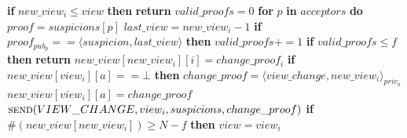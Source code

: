 \documentclass[algorithms,article,accept,moreauthors,pdftex,10pt,a4paper]{Definitions/mdpi}
\begin{document}
\begin{algorithm}[H]
\begin{algorithmic}[1]
\State\hspace{\algorithmicindent} \textbf{if} $new\_view_i \leq view$ \textbf{then}
\State\hspace{\algorithmicindent}\hspace{\algorithmicindent}\textbf{return}
\State
\State\hspace{\algorithmicindent} $valid\_proofs = 0$
\State\hspace{\algorithmicindent} \textbf{for} $p$ \textbf{in} $acceptors$ \textbf{do} 
\State\hspace{\algorithmicindent}\hspace{\algorithmicindent} $proof = suspicions[p]$
\State\hspace{\algorithmicindent}\hspace{\algorithmicindent} $last\_view = new\_view_i-1$
\State\hspace{\algorithmicindent}\hspace{\algorithmicindent} \textbf{if} $proof_{pub_p} == \langle suspicion, last\_view \rangle$ \textbf{then}
\State\hspace{\algorithmicindent}\hspace{\algorithmicindent}\hspace{\algorithmicindent} $valid\_proofs \mathrel{+{=}} 1$
\State
\State\hspace{\algorithmicindent} \textbf{if} $valid\_proofs \leq f$ \textbf{then}
\State\hspace{\algorithmicindent}\hspace{\algorithmicindent} \textbf{return}
\State
\State\hspace{\algorithmicindent} $new\_view[new\_view_i][i] = change\_proof_i$
\State\hspace{\algorithmicindent} \textbf{if} $new\_view[view_i][a] == \bot$ \textbf{then} 
\State\hspace{\algorithmicindent}\hspace{\algorithmicindent} $change\_proof = \langle view\_change, new\_view_i \rangle_{priv_a}$
\State\hspace{\algorithmicindent}\hspace{\algorithmicindent} $new\_view[view_i][a] = change\_proof$
\State\hspace{\algorithmicindent}\hspace{\algorithmicindent} $\Call{send}{VIEW\_CHANGE, view_i, suspicions, change\_proof}$
\State
\State\hspace{\algorithmicindent} \textbf{if} $\#(new\_view[new\_view_i]) \geq N-f$ \textbf{then}
\State\hspace{\algorithmicindent}\hspace{\algorithmicindent} $view = view_i$

\end{algorithmic}
\end{algorithm}
\end{document}
